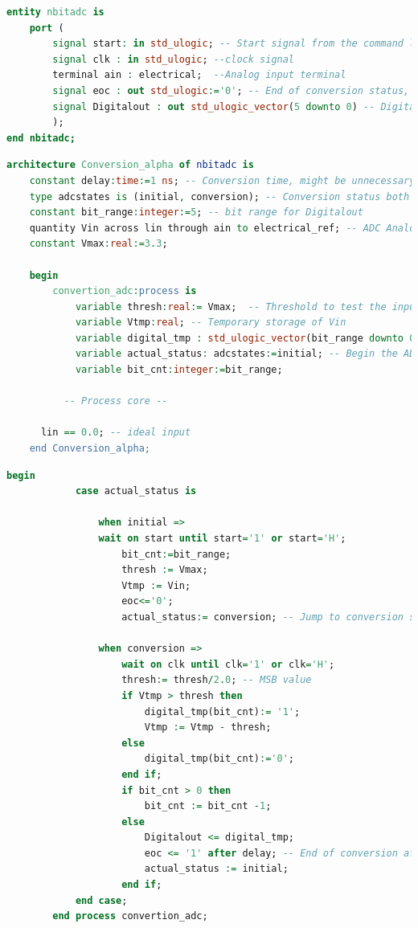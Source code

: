\documentclass[a4paper]{article}
\begin{document}
\begin{lstlisting}[language=VHDL, belowskip=-0.5 \baselineskip]
entity nbitadc is
	port (
		signal start: in std_ulogic; -- Start signal from the command logic
		signal clk : in std_ulogic; --clock signal
		terminal ain : electrical;  --Analog input terminal
		signal eoc : out std_ulogic:='0'; -- End of conversion status, initialized on default and used by the command logic
		signal Digitalout : out std_ulogic_vector(5 downto 0) -- Digital 6 bits output
		);
end nbitadc;
\end{lstlisting}

\begin{lstlisting}[language=VHDL, belowskip=-0.5 \baselineskip]
architecture Conversion_alpha of nbitadc is
	constant delay:time:=1 ns; -- Conversion time, might be unnecessary
	type adcstates is (initial, conversion); -- Conversion status both initial and on time
	constant bit_range:integer:=5; -- bit range for Digitalout
	quantity Vin across lin through ain to electrical_ref; -- ADC Analog input
	constant Vmax:real:=3.3;

	begin
		convertion_adc:process is
			variable thresh:real:= Vmax;  -- Threshold to test the input voltage against
			variable Vtmp:real; -- Temporary storage of Vin
			variable digital_tmp : std_ulogic_vector(bit_range downto 0); -- Temporary digital output data
			variable actual_status: adcstates:=initial; -- Begin the ADC states with the initial state
			variable bit_cnt:integer:=bit_range;

          -- Process core --

      lin == 0.0; -- ideal input
    end Conversion_alpha;
\end{lstlisting}

\begin{lstlisting}[caption={Coeur du process pour le convertisseur},captionpos=b,language=VHDL, belowskip=-0.5 \baselineskip]
			begin
			case actual_status is

				when initial =>
				wait on start until start='1' or start='H';
					bit_cnt:=bit_range;
					thresh := Vmax;
					Vtmp := Vin;
					eoc<='0';
					actual_status:= conversion; -- Jump to conversion state

				when conversion =>
					wait on clk until clk='1' or clk='H';
					thresh:= thresh/2.0; -- MSB value
					if Vtmp > thresh then
						digital_tmp(bit_cnt):= '1';
						Vtmp := Vtmp - thresh;
					else
						digital_tmp(bit_cnt):='0';
					end if;
					if bit_cnt > 0 then
						bit_cnt := bit_cnt -1;
					else
						Digitalout <= digital_tmp;
						eoc <= '1' after delay; -- End of conversion after a delay
						actual_status := initial;
					end if;
			end case;
		end process convertion_adc;

\end{lstlisting}
\end{document}

